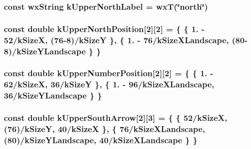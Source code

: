 \hypertarget{a00222_a3dabf1a06c72414e629a674c0ae06757}{
\subsubsection[{k\-Upper\-North\-Label}]{\setlength{\rightskip}{0pt plus 5cm}const wx\-String k\-Upper\-North\-Label = wx\-T(\char`\"{}north\char`\"{})\hspace{0.3cm}{\ttfamily [static]}}}\label{a00222_a3dabf1a06c72414e629a674c0ae06757}
\hypertarget{a00222_a9dcacd107a2e4a921b5026c043a37bd7}{
\subsubsection[{k\-Upper\-North\-Position}]{\setlength{\rightskip}{0pt plus 5cm}const double k\-Upper\-North\-Position\mbox{[}2\mbox{]}\mbox{[}2\mbox{]} = \{ \{ 1. -\/ 52/{\bf k\-Size\-X}, (76-\/8)/{\bf k\-Size\-Y} \}, \{ 1. -\/ 76/{\bf k\-Size\-X\-Landscape}, (80-\/8)/{\bf k\-Size\-Y\-Landscape} \} \}\hspace{0.3cm}{\ttfamily [static]}}}\label{a00222_a9dcacd107a2e4a921b5026c043a37bd7}
\hypertarget{a00222_a8c99bd57d6d85ae85596efe5d38394d1}{
\subsubsection[{k\-Upper\-Number\-Position}]{\setlength{\rightskip}{0pt plus 5cm}const double k\-Upper\-Number\-Position\mbox{[}2\mbox{]}\mbox{[}2\mbox{]} = \{ \{ 1. -\/ 62/{\bf k\-Size\-X}, 36/{\bf k\-Size\-Y} \}, \{ 1. -\/ 96/{\bf k\-Size\-X\-Landscape}, 36/{\bf k\-Size\-Y\-Landscape} \} \}\hspace{0.3cm}{\ttfamily [static]}}}\label{a00222_a8c99bd57d6d85ae85596efe5d38394d1}
\hypertarget{a00222_a7108ab754109d418b1e23443b9dd114d}{
\subsubsection[{k\-Upper\-South\-Arrow}]{\setlength{\rightskip}{0pt plus 5cm}const double k\-Upper\-South\-Arrow\mbox{[}2\mbox{]}\mbox{[}3\mbox{]} = \{ \{ 52/{\bf k\-Size\-X}, (76)/{\bf k\-Size\-Y}, 40/{\bf k\-Size\-X} \}, \{ 76/{\bf k\-Size\-X\-Landscape}, (80)/{\bf k\-Size\-Y\-Landscape}, 40/{\bf k\-Size\-X\-Landscape} \} \}\hspace{0.3cm}{\ttfamily [static]}}}\label{a00222_a7108ab754109d418b1e23443b9dd114d}
